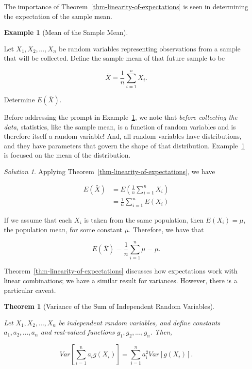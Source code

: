 \documentclass[
  letterpaper,
  DIV=11,
  numbers=noendperiod]{scrreprt}
\theoremstyle{definition}
\theoremstyle{definition}
\newtheorem{example}{Example}[chapter]
\theoremstyle{plain}
\newtheorem{theorem}{Theorem}[chapter]
\theoremstyle{remark}
\newtheorem*{solution}{Solution}
\begin{document}
The importance of Theorem~\ref{thm-linearity-of-expectations} is seen in
determining the expectation of the sample mean.

\begin{example}[Mean of the Sample
Mean]\protect\hypertarget{exm-mean-xbar}{}\label{exm-mean-xbar}

Let \(X_1, X_2, \dotsc, X_n\) be random variables representing
observations from a sample that will be collected. Define the sample
mean of that future sample to be

\[\bar{X} = \frac{1}{n} \sum_{i=1}^{n} X_i.\]

Determine \(E\left(\bar{X}\right)\).

\end{example}

Before addressing the prompt in Example~\ref{exm-mean-xbar}, we note
that \emph{before collecting the data}, statistics, like the sample
mean, is a function of random variables and is therefore itself a random
variable! And, all random variables have distributions, and they have
parameters that govern the shape of that distribution.
Example~\ref{exm-mean-xbar} is focused on the mean of the distribution.

\begin{solution}

Applying Theorem~\ref{thm-linearity-of-expectations}, we have

\[
\begin{aligned}
  E\left(\bar{X}\right)
    &= E\left(\frac{1}{n} \sum_{i=1}^{n} X_i\right) \\
    &= \frac{1}{n} \sum_{i=1}^{n} E\left(X_i\right)
\end{aligned}
\]

If we assume that each \(X_i\) is taken from the same population, then
\(E\left(X_i\right) = \mu\), the population mean, for some constant
\(\mu\). Therefore, we have that

\[E\left(\bar{X}\right) = \frac{1}{n} \sum_{i=1}^{n} \mu = \mu.\]

\end{solution}

Theorem~\ref{thm-linearity-of-expectations} discusses how expectations
work with linear combinations; we have a similar result for variances.
However, there is a particular caveat.

\begin{theorem}[Variance of the Sum of Independent Random
Variables]\protect\hypertarget{thm-variance-independent-sum}{}\label{thm-variance-independent-sum}

Let \(X_1, X_2, \dotsc, X_n\) be independent random variables, and
define constants \(a_1, a_2, \dotsc, a_n\) and real-valued functions
\(g_1, g_2, \dotsc, g_n\). Then,

\[Var\left[\sum_{i=1}^{n} a_i g\left(X_i\right)\right] = \sum_{i=1}^{n} a^2_i Var\left[g\left(X_i\right)\right].\]

\end{theorem}
\end{document}
